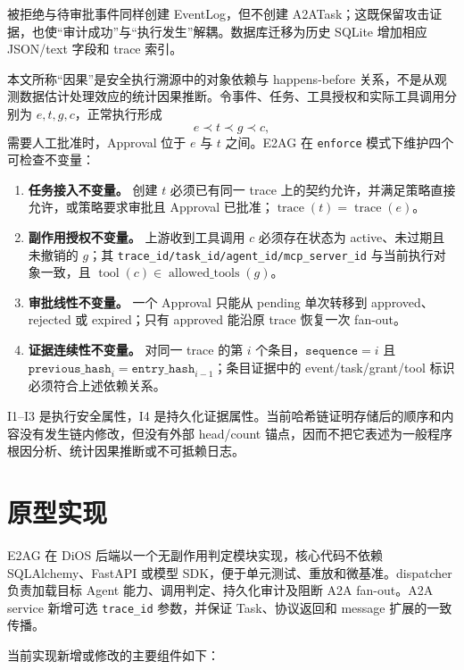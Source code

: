 被拒绝与待审批事件同样创建 EventLog，但不创建 A2ATask；这既保留攻击证据，也使``审计成功''与``执行发生''解耦。数据库迁移为历史 SQLite 增加相应 JSON/text 字段和 trace 索引。

本文所称``因果''是安全执行溯源中的对象依赖与 happens-before 关系，不是从观测数据估计处理效应的统计因果推断。令事件、任务、工具授权和实际工具调用分别为 $e,t,g,c$，正常执行形成
\[
e \prec t \prec g \prec c,
\]
需要人工批准时，Approval 位于 $e$ 与 $t$ 之间。E2AG 在 \texttt{enforce} 模式下维护四个可检查不变量：

\begin{enumerate}[label=\textbf{I\arabic*.},leftmargin=3.2em]
\item \textbf{任务接入不变量。} 创建 $t$ 必须已有同一 trace 上的契约允许，并满足策略直接允许，或策略要求审批且 Approval 已批准；$\operatorname{trace}(t)=\operatorname{trace}(e)$。
\item \textbf{副作用授权不变量。} 上游收到工具调用 $c$ 必须存在状态为 active、未过期且未撤销的 $g$；其 \texttt{trace\_id/task\_id/agent\_id/mcp\_server\_id} 与当前执行对象一致，且 $\operatorname{tool}(c)\in\operatorname{allowed\_tools}(g)$。
\item \textbf{审批线性不变量。} 一个 Approval 只能从 pending 单次转移到 approved、rejected 或 expired；只有 approved 能沿原 trace 恢复一次 fan-out。
\item \textbf{证据连续性不变量。} 对同一 trace 的第 $i$ 个条目，$\texttt{sequence}=i$ 且 $\texttt{previous\_hash}_i=\texttt{entry\_hash}_{i-1}$；条目证据中的 event/task/grant/tool 标识必须符合上述依赖关系。
\end{enumerate}

I1--I3 是执行安全属性，I4 是持久化证据属性。当前哈希链证明存储后的顺序和内容没有发生链内修改，但没有外部 head/count 锚点，因而不把它表述为一般程序根因分析、统计因果推断或不可抵赖日志。

\section{原型实现}\label{sec:implementation}

E2AG 在 DiOS 后端以一个无副作用判定模块实现，核心代码不依赖 SQLAlchemy、FastAPI 或模型 SDK，便于单元测试、重放和微基准。dispatcher 负责加载目标 Agent 能力、调用判定、持久化审计及阻断 A2A fan-out。A2A service 新增可选 \texttt{trace\_id} 参数，并保证 Task、协议返回和 message 扩展的一致传播。

当前实现新增或修改的主要组件如下：

